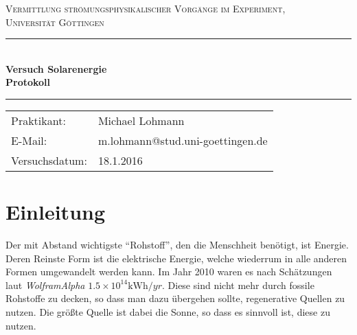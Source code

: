 \documentclass[12pt,a4paper,titlepage,headinclude,bibtotoc]{scrartcl}
\begin{document}
\begin{titlepage}
\centering
\textsc{\Large Vermittlung strömungsphysikalischer Vorgänge im Experiment,
\\[1.5ex] Universität Göttingen}

\vspace*{3cm}

\rule{\textwidth}{1pt}\\[0.5cm]
{\huge \bfseries
  Versuch Solarenergie  \\[1.5ex]
  Protokoll}\\[0.5cm]
\rule{\textwidth}{1pt}

\vspace*{3cm}

\begin{Large}
\begin{tabular}{ll}
Praktikant: &  Michael Lohmann\\
 E-Mail: & m.lohmann@stud.uni-goettingen.de\\
 Versuchsdatum: & 18.1.2016\\
\end{tabular}
\end{Large}

\vspace*{0.8cm}

\begin{Large}
\end{Large}

\end{titlepage}

\newpage

\section{Einleitung}
Der mit Abstand wichtigste "`Rohstoff"', den die Menschheit benötigt, ist Energie.
Deren Reinste Form ist die elektrische Energie, welche wiederrum in alle anderen Formen umgewandelt werden kann.
Im Jahr 2010 waren es nach Schätzungen laut \textit{WolframAlpha} $1.5\times10^{14}\si{\kilo\watt\hour\per yr}$.
Diese sind nicht mehr durch fossile Rohstoffe zu decken, so dass man dazu übergehen sollte, regenerative Quellen zu nutzen.
Die größte Quelle ist dabei die Sonne, so dass es sinnvoll ist, diese zu nutzen.
\end{document}
